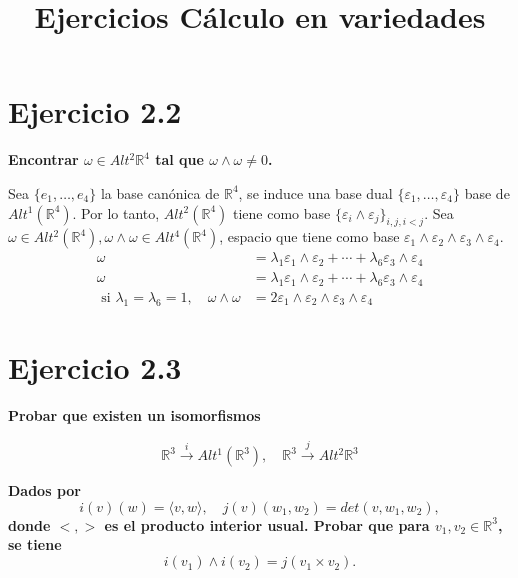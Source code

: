 \documentclass{article}
\begin{document}
\title{Ejercicios Cálculo en variedades}
\maketitle


\section{Ejercicio 2.2}

\textbf{Encontrar $\omega\in Alt^2\mathbb{R}^4$ tal que $\omega\wedge \omega \neq 0$.}
\vspace{3mm}

Sea $\{e_1,\dots,e_4\}$ la base canónica de $\mathbb{R}^4$, se induce una base dual $\{\varepsilon_1,\dots,\varepsilon_4\}$ base de $Alt^1(\mathbb{R}^4)$. Por lo tanto, $Alt^2(\mathbb{R}^4)$ tiene como base $\{\varepsilon_i\wedge \varepsilon_j\}_{i,j,i<j}$. Sea $\omega\in Alt^2(\mathbb{R}^4), \omega\wedge \omega \in Alt^4(\mathbb{R}^4)$, espacio que tiene como base $\varepsilon_1\wedge \varepsilon_2 \wedge \varepsilon_3 \wedge \varepsilon_4$. 
\begin{equation}
  \begin{split}
    \omega &= \lambda_1 \varepsilon_1\wedge \varepsilon_2+\cdots + \lambda_6\varepsilon_3\wedge \varepsilon_4 \\
    \omega &= \lambda_1 \varepsilon_1\wedge \varepsilon_2+\cdots + \lambda_6\varepsilon_3\wedge \varepsilon_4 \\
\text{ si } \lambda_1=\lambda_6=1,\quad \omega\wedge \omega &= 2\varepsilon_1\wedge \varepsilon_2 \wedge \varepsilon_3 \wedge \varepsilon_4
  \end{split}
\end{equation}

\section{Ejercicio 2.3}

\textbf{Probar que existen un isomorfismos}
\vspace{3mm}

$$\mathbb{R}^3\xrightarrow{i} Alt^1(\mathbb{R}^3), \quad \mathbb{R}^3 \xrightarrow{j} Alt^2\mathbb{R}^3 $$

\textbf{Dados por}
$$i(v)(w)=\langle v , w \rangle, \quad j(v)(w_1,w_2)=det(v,w_1,w_2), $$
\textbf{donde $<,>$ es el producto interior usual. Probar que para $v_1,v_2\in \mathbb{R}^3$, se tiene}
$$i(v_1)\wedge i(v_2)=j(v_1\times v_2). $$
\end{document}
